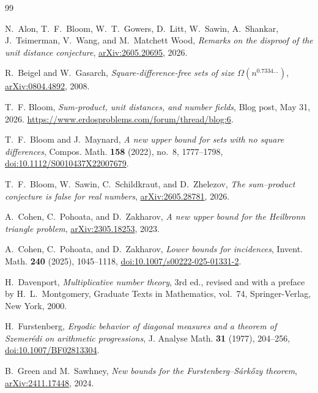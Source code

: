 \documentclass[11pt,reqno]{amsart}
\theoremstyle{definition}
\theoremstyle{remark}
\begin{document}
\begin{thebibliography}{99}

N.~Alon, T.~F.~Bloom, W.~T.~Gowers, D.~Litt, W.~Sawin, A.~Shankar,
J.~Tsimerman, V.~Wang, and M.~Matchett Wood,
\emph{Remarks on the disproof of the unit distance conjecture},
\href{https://arxiv.org/abs/2605.20695}{arXiv:2605.20695}, 2026.

R.~Beigel and W.~Gasarch,
\emph{Square-difference-free sets of size
$\Omega(n^{0.7334\ldots})$},
\href{https://arxiv.org/abs/0804.4892}{arXiv:0804.4892}, 2008.

T.~F. Bloom, {\em Sum-product, unit distances, and number fields}, Blog post, May 31, 2026.
\newblock \url{https://www.erdosproblems.com/forum/thread/blog:6}.

T.~F.~Bloom and J.~Maynard,
\emph{A new upper bound for sets with no square differences},
Compos. Math. \textbf{158} (2022), no.~8, 1777--1798,
\href{https://doi.org/10.1112/S0010437X22007679}{doi:10.1112/S0010437X22007679}.

T.~F.~Bloom, W.~Sawin, C.~Schildkraut, and D.~Zhelezov,
\emph{The sum--product conjecture is false for real numbers},
\href{https://arxiv.org/abs/2605.28781}{arXiv:2605.28781}, 2026.

A.~Cohen, C.~Pohoata, and D.~Zakharov,
\emph{A new upper bound for the Heilbronn triangle problem},
\href{https://arxiv.org/abs/2305.18253}{arXiv:2305.18253}, 2023.

A.~Cohen, C.~Pohoata, and D.~Zakharov,
\emph{Lower bounds for incidences},
Invent. Math. \textbf{240} (2025), 1045--1118,
\href{https://doi.org/10.1007/s00222-025-01331-2}{doi:10.1007/s00222-025-01331-2}.

H.~Davenport,
\emph{Multiplicative number theory},
3rd ed., revised and with a preface by H.~L.~Montgomery,
Graduate Texts in Mathematics, vol.~74,
Springer-Verlag, New York, 2000.

H.~Furstenberg,
\emph{Ergodic behavior of diagonal measures and a theorem of
{Szemer\'edi} on arithmetic progressions},
J. Analyse Math. \textbf{31} (1977), 204--256,
\href{https://doi.org/10.1007/BF02813304}{doi:10.1007/BF02813304}.

B.~Green and M.~Sawhney,
\emph{New bounds for the {Furstenberg--S\'ark\H{o}zy} theorem},
\href{https://arxiv.org/abs/2411.17448}{arXiv:2411.17448}, 2024.


\end{thebibliography}
\end{document}

